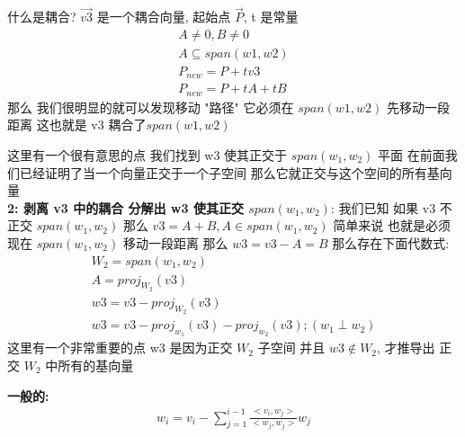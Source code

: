 \documentclass[12pt]{article}
\begin{document}
\begin{flushleft}
\begin{itemize}
        什么是耦合?
        $\vec{v3}$ 是一个耦合向量,
        起始点 $\vec{P}$, t 是常量 \\
        \begin{align}
            A \neq 0, B \neq 0      \\
            A \subseteq span(w1,w2) \\
            P_{new} = P + tv3       \\
            P_{new} = P + tA + tB
        \end{align}
        那么 我们很明显的就可以发现移动 "路径" 它必须在 $span(w1,w2)$ 先移动一段距离
        这也就是 v3 耦合了$span(w1,w2)$

        这里有一个很有意思的点
        我们找到 w3 使其正交于 $span(w_{1}, w_{2})$ 平面 在前面我们已经证明了当一个向量正交于一个子空间 那么它就正交与这个空间的所有基向量 \\


        \textbf{2: 剥离 v3 中的耦合 分解出 w3 使其正交 $span(w_{1}, w_{2})$}:
        我们已知 如果 v3 不正交 $span(w_{1},w_{2})$
        那么 $v3 = A + B, A \in span(w_{1},w_{2})$ 简单来说 也就是必须现在 $span(w_{1},w_{2})$ 移动一段距离
        那么 $w3 = v3 - A = B$
        那么存在下面代数式:
        \begin{align}
            W_{2} = span(w_{1}, w_{2}) \\
            A  = proj_{W_{2}}(v3)      \\
            w3 = v3 - proj_{W_{2}}(v3) \\
            w3 = v3 - proj_{w_{1}}(v3) - proj_{w_{2}}(v3); (w_{1} \perp w_{2})
        \end{align}
        这里有一个非常重要的点 w3 是因为正交 $W_{2}$ 子空间 并且 $w3 \notin W_{2}$, 才推导出 正交 $W_{2}$ 中所有的基向量

        \textbf{一般的: }
        \begin{align}
            w_{i} = v_{i} - \sum_{j=1}^{i-1}\frac{<v_{i},w_{j}>}{<w_{j},w_{j}>}w_{j}
        \end{align}

    \end{itemize}
\end{flushleft}
\end{document}
